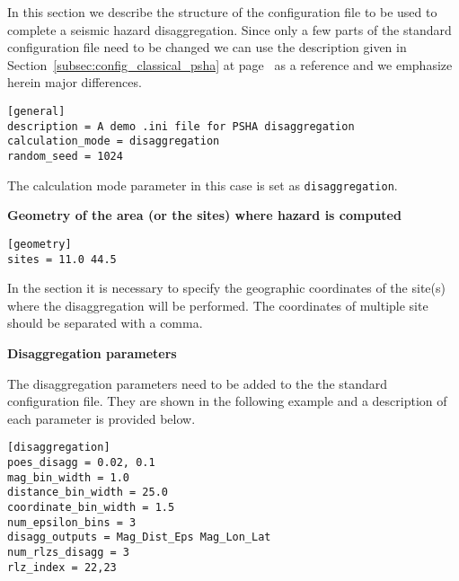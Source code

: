 In this section we describe the structure of the configuration file to be used
to complete a seismic hazard disaggregation. Since only a few parts of the
standard configuration file need to be changed we can use the description
given in Section~\ref{subsec:config_classical_psha} at
page~\pageref{subsec:config_classical_psha} as a reference and we emphasize
herein major differences.

\begin{verbatim}
[general]
description = A demo .ini file for PSHA disaggregation
calculation_mode = disaggregation
random_seed = 1024
\end{verbatim}

The calculation mode parameter in this case is set as
\texttt{disaggregation}.

\textbf{Geometry of the area (or the sites) where hazard is computed}

\begin{verbatim}
[geometry]
sites = 11.0 44.5
\end{verbatim}

In the section it is necessary to specify the geographic coordinates of
the site(s) where the disaggregation will be performed. The coordinates
of multiple site should be separated with a comma.

\textbf{Disaggregation parameters}

The disaggregation parameters need to be added to the the standard
configuration file. They are shown in the following example and a description
of each parameter is provided below.

\begin{verbatim}
[disaggregation]
poes_disagg = 0.02, 0.1
mag_bin_width = 1.0
distance_bin_width = 25.0
coordinate_bin_width = 1.5
num_epsilon_bins = 3
disagg_outputs = Mag_Dist_Eps Mag_Lon_Lat
num_rlzs_disagg = 3
rlz_index = 22,23
\end{verbatim}

